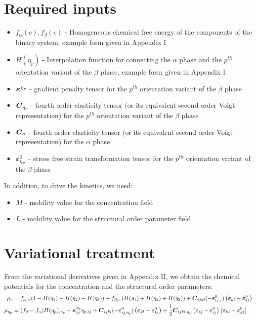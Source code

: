 \documentclass[11pt]{article}
\renewcommand{\=}[1]{\stackrel{#1}{=}} %
\theoremstyle{definition}
\theoremstyle{remark}
\def\Bkappa{\mbox{\boldmath$\kappa$}}
\def\Bvarepsilon{\mbox{\boldmath$\varepsilon$}}
\def\bC{\mbox{\boldmath$ C$}}
\begin{document}
\section{Required inputs}
\begin{itemize}
\item $f_{\alpha}(c), f_{\beta}(c)$ - Homogeneous chemical free energy of the components of the binary system, example form given in Appendix I
\item $H(\eta_p)$ - Interpolation function for connecting the $\alpha$ phase and the $p^{th}$ orientation variant of the $\beta$ phase, example form given in Appendix I
\item $\Bkappa^{\eta_p}$  - gradient penalty tensor for the $p^{th}$ orientation variant of the $\beta$ phase
\item $\bC_{\eta_p}$ - fourth order elasticity tensor (or its equivalent second order Voigt representation) for the $p^{th}$ orientation variant of the $\beta$ phase
\item $\bC_{\alpha}$ - fourth order elasticity tensor (or its equivalent second order Voigt representation) for the $\alpha$ phase
\item $\Bvarepsilon^0_{\eta_p}$ - stress free strain transformation tensor for the $p^{th}$ orientation variant of the $\beta$ phase
\end{itemize}
In addition, to drive the kinetics, we need:
\begin{itemize}
\item $M$  - mobility value for the concentration field
\item $L$  - mobility value for the structural order parameter field
\end{itemize}

\section{Variational treatment}
From the variational derivatives given in Appendix II, we obtain the chemical potentials for the concentration and the structural order parameters:
\begin{align}
  \mu_{c}  &= f_{\alpha,c} \left( 1- H(\eta_1)-H(\eta_2)-H(\eta_3)\right) +f_{\beta,c} \left(  H(\eta_1)  + H(\eta_2) + H(\eta_3) \right)  + \bC_{ijkl} (- \Bvarepsilon^0_{ij,c}) \left( \Bvarepsilon_{kl} - \Bvarepsilon^0_{kl}\right) \\
  \mu_{\eta_p}  &= (f_{\beta}-f_{\alpha})H(\eta_p)_{,\eta_p} - \Bkappa^{\eta_p}_{ij} \eta_{p,ij} + \bC_{ijkl} (- \Bvarepsilon^0_{ij,\eta_p}) \left( \Bvarepsilon_{kl} - \Bvarepsilon^0_{kl}\right) + \frac{1}{2} \bC_{ijkl,\eta_p} \left( \Bvarepsilon_{ij} - \Bvarepsilon ^0_{ij} \right) \left( \Bvarepsilon_{kl} - \Bvarepsilon^0_{kl}\right)
\end{align}
\end{document}
